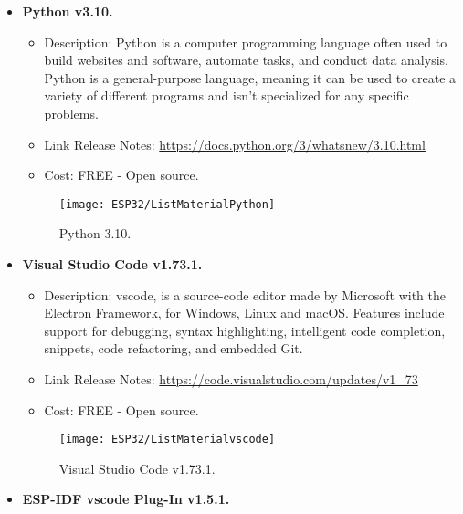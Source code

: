 \begin{itemize}
    \item \textbf{Python v3.10.}
    
    \begin{itemize}
        \item Description: Python is a computer programming language often used to build websites and software, automate tasks, and conduct data analysis. Python is a general-purpose language, meaning it can be used to create a variety of different programs and isn't specialized for any specific problems.
        \item Link Release Notes: \url{https://docs.python.org/3/whatsnew/3.10.html}
        \item Cost: FREE - Open source.
    \end{itemize}
    
    \begin{figure}  
        \begin{center}
            \texttt{[image: ESP32/ListMaterialPython]}
            \caption{Python 3.10.} 
            \label{fig:Python 3.10.}
        \end{center}
    \end{figure}			
    
    \item \textbf{Visual Studio Code v1.73.1.} 
    
    \begin{itemize}
        \item Description: \ac{vscode}, is a source-code editor made by Microsoft with the Electron Framework, for Windows, Linux and macOS. Features include support for debugging, syntax highlighting, intelligent code completion, snippets, code refactoring, and embedded Git.
        \item Link Release Notes: \url{https://code.visualstudio.com/updates/v1_73}
        \item Cost: FREE - Open source.
    \end{itemize}
    \begin{figure}  [H]
        \begin{center}
            \texttt{[image: ESP32/ListMaterialvscode]}
            \caption{Visual Studio Code v1.73.1.} 
            \label{fig:Visual Studio Code v1.73.1.}
        \end{center}
    \end{figure}			
    
    \item \textbf{ESP-IDF \ac{vscode} Plug-In v1.5.1.} 
    

\end{itemize}
